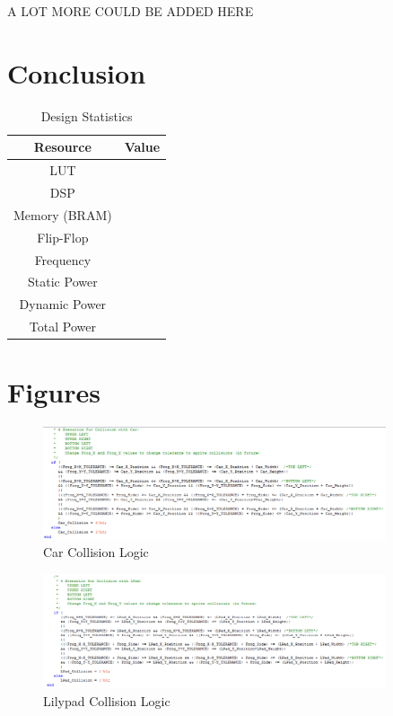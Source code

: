 \documentclass[journal, twocolumn, final,11pt,letterpaper]{IEEEtran}
\begin{document}
A LOT MORE COULD BE ADDED HERE\\

\section{Conclusion} 
\begin{table}[htbp]
	\centering
	\begin{tabular}{c|c}	%
		\toprule	%
		Resource & Value \\
		\midrule
		LUT & \\
		DSP & \\
		Memory (BRAM) & \\
		Flip-Flop & \\
		Frequency &  \\
		Static Power & \\
		Dynamic Power & \\
		Total Power & \\
		\bottomrule	%
	\end{tabular}%
	\caption{Design Statistics}
	\label{tab:design}
\end{table}



\clearpage
\onecolumn
\section{Figures}

\begin{figure}[H]
	\centering
	\includegraphics[width=0.9\textwidth]{car_collision.png}
	\caption{Car Collision Logic}
	\label{fig:car-collision}
\end{figure}

\begin{figure}[H]
	\centering
	\includegraphics[width=0.9\textwidth]{lilypad_collision.png}
	\caption{Lilypad Collision Logic}
	\label{fig:lilypad-collision}
\end{figure}
\end{document}
